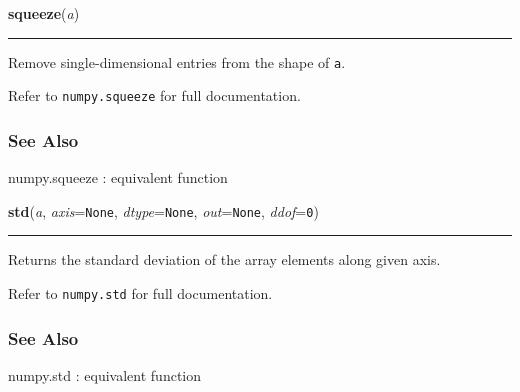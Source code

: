     \begin{boxedminipage}{\textwidth}

    \raggedright \textbf{squeeze}(\textit{a})

    \vspace{-1.5ex}

    \rule{\textwidth}{0.5\fboxrule}

Remove single-dimensional entries from the shape of \texttt{a}.

Refer to \texttt{numpy.squeeze} for full documentation.



\hypertarget{see-also}{}
\subsubsection*{See Also}

numpy.squeeze : equivalent function
    \vspace{1ex}

    \end{boxedminipage}

    \label{numpy:ndarray:std}

    \vspace{0.5ex}

    \begin{boxedminipage}{\textwidth}

    \raggedright \textbf{std}(\textit{a}, \textit{axis}=\texttt{None}, \textit{dtype}=\texttt{None}, \textit{out}=\texttt{None}, \textit{ddof}=\texttt{0})

    \vspace{-1.5ex}

    \rule{\textwidth}{0.5\fboxrule}

Returns the standard deviation of the array elements along given axis.

Refer to \texttt{numpy.std} for full documentation.



\hypertarget{see-also}{}
\subsubsection*{See Also}

numpy.std : equivalent function
    \vspace{1ex}

    \end{boxedminipage}

